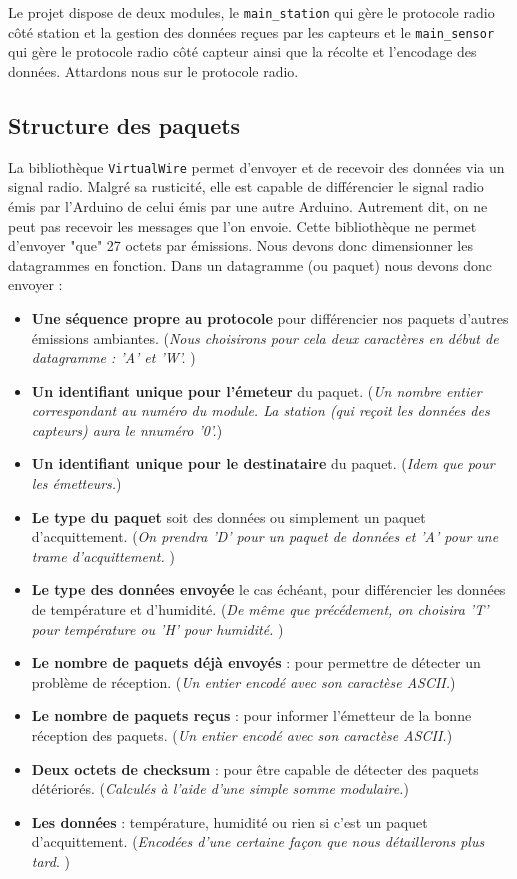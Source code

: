 \documentclass[a4paper]{article}
\begin{document}
Le projet dispose de deux modules, le \texttt{main\_station} qui gère le protocole radio côté station et 
la gestion des données reçues par les capteurs et le \texttt{main\_sensor} qui gère le protocole radio côté 
capteur ainsi que la récolte et l'encodage des données. Attardons nous sur le protocole radio. 

\subsection{Structure des paquets}

La bibliothèque \texttt{VirtualWire} permet d'envoyer et de recevoir des données via un signal radio.
Malgré sa rusticité, elle est capable de différencier le signal radio émis par l'Arduino de celui émis par une 
autre Arduino. Autrement dit, on ne peut pas recevoir les messages que l'on envoie. 
Cette bibliothèque ne permet d'envoyer "que" 27 octets par émissions. Nous devons donc dimensionner les datagrammes en fonction. 
Dans un datagramme (ou paquet) nous devons donc envoyer : 
\begin{itemize}
    \item \textbf{Une séquence propre au protocole} pour différencier nos paquets d'autres émissions ambiantes. 
        (\emph{Nous choisirons pour cela deux caractères en début de datagramme : 'A' et 'W'. })
    \item \textbf{Un identifiant unique pour l'émeteur} du paquet. 
        (\emph{Un nombre entier correspondant au numéro du module. La station (qui reçoit les données 
        des capteurs) aura le nnuméro '0'.})
    \item \textbf{Un identifiant unique pour le destinataire} du paquet. 
        (\emph{Idem que pour les émetteurs.})
    \item \textbf{Le type du paquet} soit des données ou simplement un paquet d'acquittement. 
        (\emph{On prendra 'D' pour un paquet de données et 'A' pour une trame d'acquittement. })
    \item \textbf{Le type des données envoyée} le cas échéant, pour différencier les données de température et d'humidité. 
        (\emph{De même que précédement, on choisira 'T' pour température ou 'H' pour humidité. })
    \item \textbf{Le nombre de paquets déjà envoyés} : pour permettre de détecter un problème de réception. 
        (\emph{Un entier encodé avec son caractèse ASCII.})
    \item \textbf{Le nombre de paquets reçus} : pour informer l'émetteur de la bonne réception des paquets. 
        (\emph{Un entier encodé avec son caractèse ASCII.})
    \item \textbf{Deux octets de checksum }: pour être capable de détecter des paquets détériorés. 
        (\emph{Calculés à l'aide d'une simple somme modulaire.})
    \item \textbf{Les données} : température, humidité ou rien si c'est un paquet d'acquittement. 
        (\emph{Encodées d'une certaine façon que nous détaillerons plus tard}. )
\end{itemize}
\end{document}
